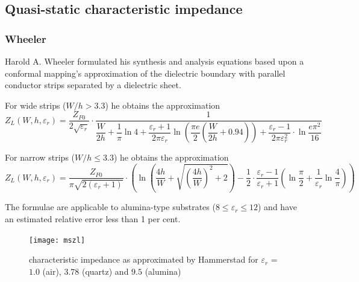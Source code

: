 \documentclass[10pt]{report}
\begin{document}
\subsection{Quasi-static characteristic impedance}

\subsubsection{Wheeler}

Harold A. Wheeler \cite{Wheeler2} formulated his synthesis and
analysis equations based upon a conformal mapping's approximation of
the dielectric boundary with parallel conductor strips separated by a
dielectric sheet.

\addvspace{12pt}

For wide strips ($W/h > 3.3$) he obtains the approximation
\begin{equation}
Z_{L}\left(W, h, \varepsilon_{r}\right) =
\frac{Z_{F0}}{2\sqrt{\varepsilon_{r}}}\cdot\frac{1}{\dfrac{W}{2h} + \dfrac{1}{\pi}\ln{4} + \dfrac{\varepsilon_{r} + 1}{2\pi \varepsilon_{r}} \ln{\left(\dfrac{\pi e}{2}\left(\dfrac{W}{2h} + 0.94\right)\right)} + \dfrac{\varepsilon_{r} - 1}{2\pi \varepsilon_{r}^{2}}\cdot \ln{\dfrac{e\pi^{2}}{16}}}
\end{equation}

For narrow strips ($W/h \le 3.3$) he obtains the approximation
\begin{equation}
Z_{L}\left(W, h, \varepsilon_{r}\right) =
\frac{Z_{F0}}{\pi \sqrt{2 \left(\varepsilon_{r} + 1\right)}} \cdot \left(\ln{\left(\frac{4h}{W} + \sqrt{\left(\frac{4h}{W}\right)^{2} + 2}\right)} - \frac{1}{2}\cdot \frac{\varepsilon_{r} - 1}{\varepsilon_{r} + 1}\left(\ln{\frac{\pi}{2}} + \frac{1}{\varepsilon_{r}} \ln{\frac{4}{\pi}}\right)\right)
\end{equation}

The formulae are applicable to alumina-type substrates ($8 \le
\varepsilon_r \le 12$) and have an estimated relative error less than
1 per cent.

\begin{figure}[ht]
\begin{center}
\texttt{[image: mszl]}
\end{center}
\caption{characteristic impedance as approximated by Hammerstad for $\varepsilon_{r}$ = $1.0$ (air), $3.78$ (quartz) and $9.5$ (alumina)}
\label{fig:mszl}
\end{figure}
\FloatBarrier
\end{document}
